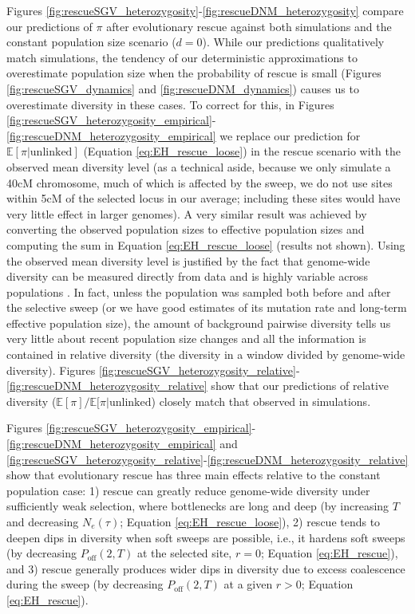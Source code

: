 \documentclass[]{article}
\begin{document}
Figures \ref{fig:rescueSGV_heterozygosity}-\ref{fig:rescueDNM_heterozygosity} compare our predictions of $\pi$ after evolutionary rescue against both simulations and the constant population size scenario ($d=0$). 
While our predictions qualitatively match simulations, the tendency of our deterministic approximations to overestimate population size when the probability of rescue is small (Figures \ref{fig:rescueSGV_dynamics} and \ref{fig:rescueDNM_dynamics}) causes us to overestimate diversity in these cases.
To correct for this, in Figures \ref{fig:rescueSGV_heterozygosity_empirical}-\ref{fig:rescueDNM_heterozygosity_empirical} we replace our prediction for $\mathbb{E}[\pi | \mathrm{unlinked}]$ (Equation \ref{eq:EH_rescue_loose}) in the rescue scenario with the observed mean diversity level (as a technical aside, because we only simulate a 40cM chromosome, much of which is affected by the sweep, we do not use sites within 5cM of the selected locus in our average; including these sites would have very little effect in larger genomes).
A very similar result was achieved by converting the observed population sizes to effective population sizes and computing the sum in Equation \ref{eq:EH_rescue_loose} (results not shown). 
Using the observed mean diversity level is justified by the fact that genome-wide diversity can be measured directly from data and is highly variable across populations \citep{tajima1983evolutionary}.
In fact, unless the population was sampled both before and after the selective sweep (or we have good estimates of its mutation rate and long-term effective population size), the amount of background pairwise diversity tells us very little about recent population size changes and all the information is contained in relative diversity (the diversity in a window divided by genome-wide diversity).
Figures \ref{fig:rescueSGV_heterozygosity_relative}-\ref{fig:rescueDNM_heterozygosity_relative} show that our predictions of relative diversity ($\mathbb{E}[\pi]/\mathbb{E}[\pi|\mathrm{unlinked}$) closely match that observed in simulations.

Figures \ref{fig:rescueSGV_heterozygosity_empirical}-\ref{fig:rescueDNM_heterozygosity_empirical} and \ref{fig:rescueSGV_heterozygosity_relative}-\ref{fig:rescueDNM_heterozygosity_relative} show that evolutionary rescue has three main effects relative to the constant population case:
1) rescue can greatly reduce genome-wide diversity under sufficiently weak selection, where bottlenecks are long and deep (by increasing $T$ and decreasing $N_e(\tau)$; Equation \ref{eq:EH_rescue_loose}),
2) rescue tends to deepen dips in diversity when soft sweeps are possible, i.e., it hardens soft sweeps (by decreasing $P_\mathrm{off}(2,T)$ at the selected site, $r=0$; Equation \ref{eq:EH_rescue}), and
3) rescue generally produces wider dips in diversity due to excess coalescence during the sweep (by decreasing $P_\mathrm{off}(2,T)$ at a given $r>0$; Equation \ref{eq:EH_rescue}).
\end{document}
